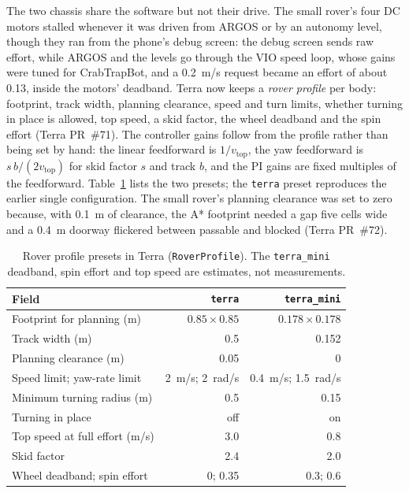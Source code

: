 The two chassis share the software but not their drive.
The small rover's four DC motors stalled whenever it was driven from ARGOS or by an autonomy level, though they ran from the phone's debug screen: the debug screen sends raw effort, while ARGOS and the levels go through the VIO speed loop, whose gains were tuned for CrabTrapBot, and a 0.2~m/s request became an effort of about 0.13, inside the motors' deadband.
Terra now keeps a \emph{rover profile} per body: footprint, track width, planning clearance, speed and turn limits, whether turning in place is allowed, top speed, a skid factor, the wheel deadband and the spin effort (Terra PR~\#71).
The controller gains follow from the profile rather than being set by hand: the linear feedforward is $1/v_{\text{top}}$, the yaw feedforward is $s\,b/(2v_{\text{top}})$ for skid factor $s$ and track $b$, and the PI gains are fixed multiples of the feedforward.
Table~\ref{tab:rover-profiles} lists the two presets; the \texttt{terra} preset reproduces the earlier single configuration.
The small rover's planning clearance was set to zero because, with 0.1~m of clearance, the A* footprint needed a gap five cells wide and a 0.4~m doorway flickered between passable and blocked (Terra PR~\#72).

\begin{table}[ht]
\centering
\caption{Rover profile presets in Terra (\texttt{RoverProfile}). The \texttt{terra\_mini} deadband, spin effort and top speed are estimates, not measurements.}
\label{tab:rover-profiles}
\begin{tabular}{@{}l r r@{}}
\toprule
Field & \texttt{terra} & \texttt{terra\_mini} \\
\midrule
Footprint for planning (m) & $0.85 \times 0.85$ & $0.178 \times 0.178$ \\
Track width (m) & 0.5 & 0.152 \\
Planning clearance (m) & 0.05 & 0 \\
Speed limit; yaw-rate limit & 2~m/s; 2~rad/s & 0.4~m/s; 1.5~rad/s \\
Minimum turning radius (m) & 0.5 & 0.15 \\
Turning in place & off & on \\
Top speed at full effort (m/s) & 3.0 & 0.8 \\
Skid factor & 2.4 & 2.0 \\
Wheel deadband; spin effort & 0; 0.35 & 0.3; 0.6 \\
\bottomrule
\end{tabular}
\end{table}

